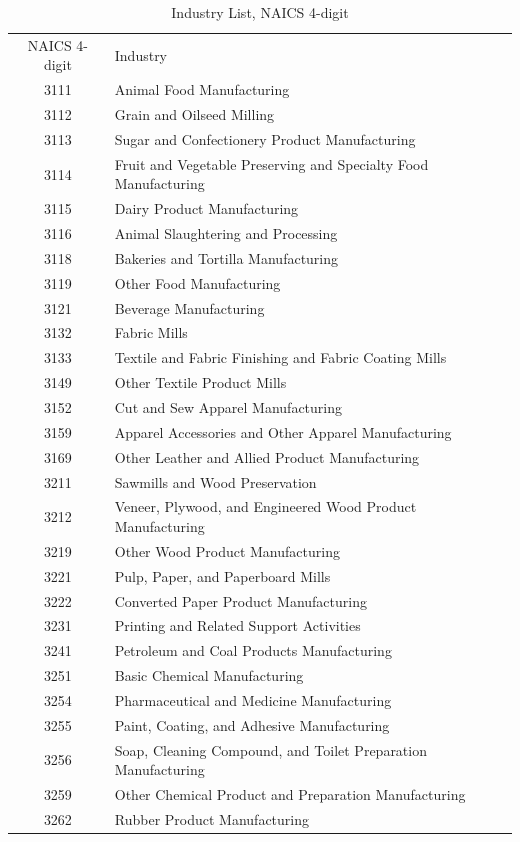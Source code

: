 \begin{longtable}{cl}
\caption{Industry List, NAICS 4-digit}\label{tab:naics4diglist}
NAICS 4-digit & Industry \\
3111 &	Animal Food Manufacturing \\
3112 &	Grain and Oilseed Milling \\
3113 &	Sugar and Confectionery Product Manufacturing \\
3114 &	Fruit and Vegetable Preserving and Specialty Food Manufacturing \\
3115 &	Dairy Product Manufacturing \\
3116 &	Animal Slaughtering and Processing \\
3118 &	Bakeries and Tortilla Manufacturing \\
3119 &	Other Food Manufacturing \\
3121 &	Beverage Manufacturing \\
3132 &	Fabric Mills \\
3133 &	Textile and Fabric Finishing and Fabric Coating Mills \\
3149 &	Other Textile Product Mills \\
3152 &	Cut and Sew Apparel Manufacturing \\
3159 &	Apparel Accessories and Other Apparel Manufacturing \\
3169 &	Other Leather and Allied Product Manufacturing \\
3211 &	Sawmills and Wood Preservation \\
3212 &	Veneer, Plywood, and Engineered Wood Product Manufacturing \\
3219 &	Other Wood Product Manufacturing \\
3221 &	Pulp, Paper, and Paperboard Mills \\
3222 &	Converted Paper Product Manufacturing \\
3231 &	Printing and Related Support Activities \\
3241 &	Petroleum and Coal Products Manufacturing \\
3251 &	Basic Chemical Manufacturing \\
3254 &	Pharmaceutical and Medicine Manufacturing \\
3255 &	Paint, Coating, and Adhesive Manufacturing \\
3256 &	Soap, Cleaning Compound, and Toilet Preparation Manufacturing \\
3259 &	Other Chemical Product and Preparation Manufacturing \\
3262 &	Rubber Product Manufacturing \\

\end{longtable}
